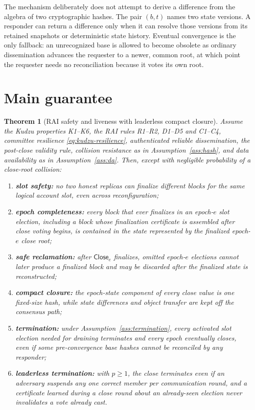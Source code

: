 \documentclass[11pt]{article}
\newtheorem{theorem}{Theorem}
\theoremstyle{remark}
\newcommand{\CE}{\mathsf{Close}}
\begin{document}
The mechanism deliberately does not attempt to derive a difference from the algebra of two cryptographic hashes. The pair $(b,t)$ names two state versions. A responder can return a difference only when it can resolve those versions from its retained snapshots or deterministic state history. Eventual convergence is the only fallback: an unrecognized base is allowed to become obsolete as ordinary dissemination advances the requester to a newer, common root, at which point the requester needs no reconciliation because it votes its own root.

\section{Main guarantee}

\begin{theorem}[RAI safety and liveness with leaderless compact closure]
Assume the Kudzu properties K1--K6, the RAI rules R1--R2, D1--D5 and C1--C4, committee resilience \eqref{eq:kudzu-resilience}, authenticated reliable dissemination, the post-close validity rule, collision resistance as in Assumption~\ref{ass:hash}, and data availability as in Assumption~\ref{ass:da}. Then, except with negligible probability of a close-root collision:
\begin{enumerate}[label=(\roman*)]
  \item \textbf{slot safety:} no two honest replicas can finalize different blocks for the same logical account slot, even across reconfiguration;
  \item \textbf{epoch completeness:} every block that ever finalizes in an epoch-$e$ slot election, including a block whose finalization certificate is assembled after close voting begins, is contained in the state represented by the finalized epoch-$e$ close root;
  \item \textbf{safe reclamation:} after $\CE_e$ finalizes, omitted epoch-$e$ elections cannot later produce a finalized block and may be discarded after the finalized state is reconstructed;
  \item \textbf{compact closure:} the epoch-state component of every close value is one fixed-size hash, while state differences and object transfer are kept off the consensus path;
  \item \textbf{termination:} under Assumption~\ref{ass:termination}, every activated slot election needed for draining terminates and every epoch eventually closes, even if some pre-convergence base hashes cannot be reconciled by any responder;
  \item \textbf{leaderless termination:} with $p\ge 1$, the close terminates even if an adversary suspends any one correct member per communication round, and a certificate learned during a close round about an already-seen election never invalidates a vote already cast.
\end{enumerate}
\end{theorem}
\end{document}
